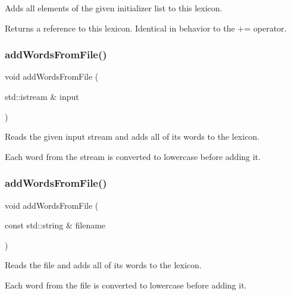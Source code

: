 Adds all elements of the given initializer list to this lexicon. 

Returns a reference to this lexicon. Identical in behavior to the += operator. \mbox{\label{classLexicon_a215fcead487aace2e89b04863e326ba6}} 
\subsubsection{\texorpdfstring{add\+Words\+From\+File()}{addWordsFromFile()}\hspace{0.1cm}{\footnotesize\ttfamily [1/2]}}
{\footnotesize\ttfamily void add\+Words\+From\+File (\begin{DoxyParamCaption}\item[{std\+::istream \&}]{input }\end{DoxyParamCaption})}



Reads the given input stream and adds all of its words to the lexicon. 

Each word from the stream is converted to lowercase before adding it. \mbox{\label{classLexicon_a3891deaa85aee9a52b6ca258d1514716}} 
\subsubsection{\texorpdfstring{add\+Words\+From\+File()}{addWordsFromFile()}\hspace{0.1cm}{\footnotesize\ttfamily [2/2]}}
{\footnotesize\ttfamily void add\+Words\+From\+File (\begin{DoxyParamCaption}\item[{const std\+::string \&}]{filename }\end{DoxyParamCaption})}



Reads the file and adds all of its words to the lexicon. 

Each word from the file is converted to lowercase before adding it. \mbox{\label{classLexicon_a324ff6b85a0d392036efefc95b5d5e83}} 
